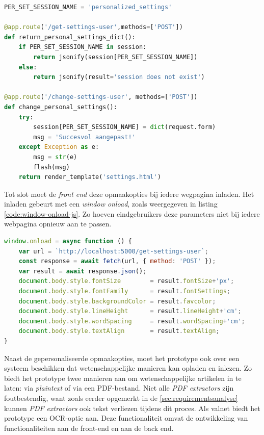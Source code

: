 \begin{lstlisting}[language=python, caption={De back end functie die de aanpassingen uit het formulier opslaat als sessievariabele.}, label={code:back-end-session-personalized}]
PER_SET_SESSION_NAME = 'personalized_settings'

@app.route('/get-settings-user',methods=['POST'])
def return_personal_settings_dict():
	if PER_SET_SESSION_NAME in session:
		return jsonify(session[PER_SET_SESSION_NAME])
	else:
		return jsonify(result='session does not exist')
	
@app.route('/change-settings-user', methods=['POST'])
def change_personal_settings():
	try:
		session[PER_SET_SESSION_NAME] = dict(request.form)
		msg = 'Succesvol aangepast!'
	except Exception as e:
		msg = str(e)
		flash(msg)
	return render_template('settings.html')
\end{lstlisting}

Tot slot moet de \textit{front end} deze opmaakopties bij iedere wegpagina inladen. Het inladen gebeurt met een \textit{window onload}, zoals weergegeven in listing \ref{code:window-onload-js}. Zo hoeven eindgebruikers deze parameters niet bij iedere webpagina opnieuw aan te passen.

\begin{lstlisting}[language=javascript, caption={De onload-functie die de gepersonaliseerde opmaakopties regelt bij het inladen van een webpagina.}, label={code:window-onload-js}]
window.onload = async function () {
	var url = `http://localhost:5000/get-settings-user`;
	const response = await fetch(url, { method: 'POST' });
	var result = await response.json();
	document.body.style.fontSize        = result.fontSize+'px';
	document.body.style.fontFamily      = result.fontSettings;
	document.body.style.backgroundColor = result.favcolor;
	document.body.style.lineHeight      = result.lineHeight+'cm';
	document.body.style.wordSpacing     = result.wordSpacing+'cm';
	document.body.style.textAlign       = result.textAlign;
}
\end{lstlisting}

Naast de gepersonaliseerde opmaakopties, moet het prototype ook over een systeem beschikken dat wetenschappelijke manieren kan opladen en inlezen. Zo biedt het prototype twee manieren aan om wetenschappelijke artikelen in te laten: via \textit{plaintext} of via een PDF-bestand. Niet alle \textit{PDF extractors} zijn foutbestendig, want zoals eerder opgemerkt in de \ref{sec:requirementsanalyse} kunnen \textit{PDF extractors} ook tekst verliezen tijdens dit proces. Als valnet biedt het prototype een OCR-optie aan. Deze functionaliteit omvat de ontwikkeling van functionaliteiten aan de front-end en aan de back end.

